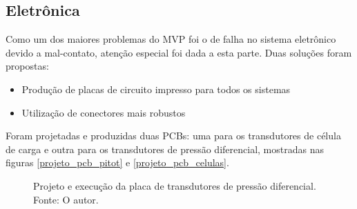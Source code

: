 \subsection{Eletrônica}

Como um dos maiores problemas do MVP foi o de falha no sistema eletrônico devido a mal-contato, atenção especial foi dada a esta parte. Duas soluções foram propostas:

\begin{itemize}
    \item Produção de placas de circuito impresso para todos os sistemas
    \item Utilização de conectores mais robustos
\end{itemize}

Foram projetadas e produzidas duas PCBs: uma para os transdutores de célula de carga e outra para os transdutores de pressão diferencial, mostradas nas figuras \ref{projeto_pcb_pitot} e \ref{projeto_pcb_celulas}.

\begin{figure}[!ht]
    \centering
    \caption{Projeto e execução da placa de transdutores de pressão diferencial. Fonte: O autor.}
        \label{projeto_pcb_pitot}
        \qquad
        \label{placa_pcb_pitot}
\end{figure}

